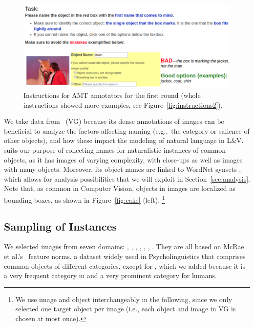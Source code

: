 \begin{figure}[htp]
  \centering
  \includegraphics[width=1.5\columnwidth]{figures/round0_cropped.png}
  \caption{Instructions for AMT annotators for the first round (whole instructions showed more examples, see Figure~\ref{fig:instructions2}).}
  \label{fig:instructions1}
\end{figure}

We take data from \vgenome~(VG) because its dense annotations of images can be beneficial to analyze the factors affecting naming (e.g.,~the category or salience of other objects), and how these impact the modeling of natural language in L\&V.
\vg suits our purpose of collecting names for naturalistic instances of common objects, as it has images of varying complexity, with close-ups as well as images with many objects.
Moreover, its object names are linked to WordNet synsets \cite{fellbaum1998wordnet}, which allows for analysis possibilities that we will exploit in Section~\ref{sec:analysis}.
Note that, as common in Computer Vision, objects in \vg images are localized as bounding boxes, as shown in Figure~\ref{fig:cake} (left).%
\footnote{We use image and object interchangeably in the following, since we only selected one target object per image (i.e., each object and image in VG is chosen at most once).}

\subsection{Sampling of Instances}
\label{ssec:sampling}

We selected images from seven domains: , , , , , , . 
They are all based on McRae et al.'s~ feature norms, a dataset widely used in Psycholinguistics that comprises common objects of different categories, except for , which we added because it is a very frequent category in \vg and a very prominent category for humans.

